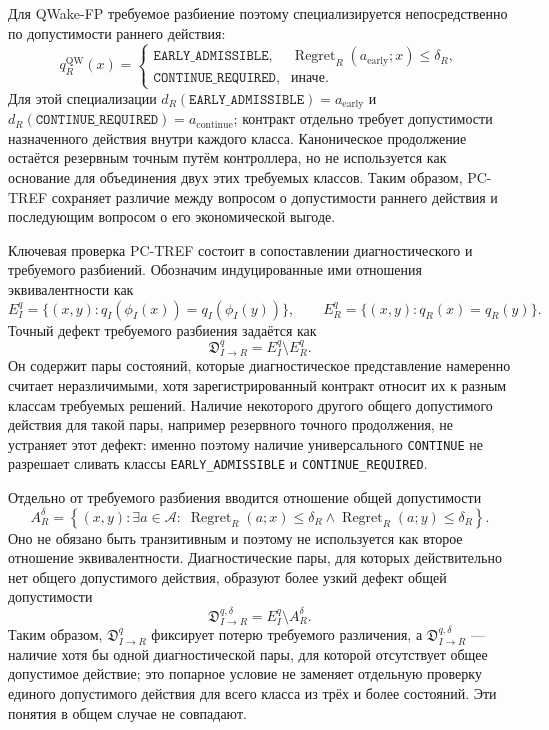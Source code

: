 Для QWake-FP требуемое разбиение поэтому специализируется непосредственно по
допустимости раннего действия:
\[
 q_R^{\mathrm{QW}}(x)=
 \begin{cases}
   \texttt{EARLY\_ADMISSIBLE}, &
   \operatorname{Regret}_R(a_{\mathrm{early}};x)\leq\delta_R,\\
   \texttt{CONTINUE\_REQUIRED}, & \text{иначе}.
 \end{cases}
\]
Для этой специализации
$d_R(\texttt{EARLY\_ADMISSIBLE})=a_{\mathrm{early}}$ и
$d_R(\texttt{CONTINUE\_REQUIRED})=a_{\mathrm{continue}}$; контракт отдельно
требует допустимости назначенного действия внутри каждого класса. Каноническое
продолжение остаётся резервным точным путём контроллера, но не используется как
основание для объединения двух этих требуемых классов. Таким образом, PC-TREF
сохраняет различие между вопросом о допустимости раннего действия и последующим
вопросом о его экономической выгоде.

Ключевая проверка PC-TREF состоит в сопоставлении диагностического и требуемого
разбиений. Обозначим индуцированные ими отношения эквивалентности как
\[
  E_I^q=\{(x,y):q_I(\phi_I(x))=q_I(\phi_I(y))\},
  \qquad
  E_R^q=\{(x,y):q_R(x)=q_R(y)\}.
\]
Точный дефект требуемого разбиения задаётся как
\[
  \mathfrak D_{I\to R}^{q}=E_I^q\setminus E_R^q.
\]
Он содержит пары состояний, которые диагностическое представление намеренно
считает неразличимыми, хотя зарегистрированный контракт относит их к разным
классам требуемых решений. Наличие некоторого другого общего допустимого
действия для такой пары, например резервного точного продолжения, не устраняет
этот дефект: именно поэтому наличие универсального \texttt{CONTINUE} не
разрешает сливать классы \texttt{EARLY\_ADMISSIBLE} и
\texttt{CONTINUE\_REQUIRED}.

Отдельно от требуемого разбиения вводится отношение общей допустимости
\[
  A_R^{\delta}
  =\left\{(x,y):\exists a\in\mathcal A:\;
  \operatorname{Regret}_R(a;x)\leq\delta_R
  \land
  \operatorname{Regret}_R(a;y)\leq\delta_R\right\}.
\]
Оно не обязано быть транзитивным и поэтому не используется как второе
отношение эквивалентности. Диагностические пары, для которых действительно
нет общего допустимого действия, образуют более узкий дефект общей допустимости
\[
  \mathfrak D_{I\to R}^{q,\delta}
  =E_I^q\setminus A_R^{\delta}.
\]
Таким образом, $\mathfrak D_{I\to R}^{q}$ фиксирует потерю требуемого
различения, а $\mathfrak D_{I\to R}^{q,\delta}$ --- наличие хотя бы одной
диагностической пары, для которой отсутствует общее допустимое действие; это
попарное условие не заменяет отдельную проверку единого допустимого действия для
всего класса из трёх и более состояний. Эти понятия в общем случае не совпадают.

